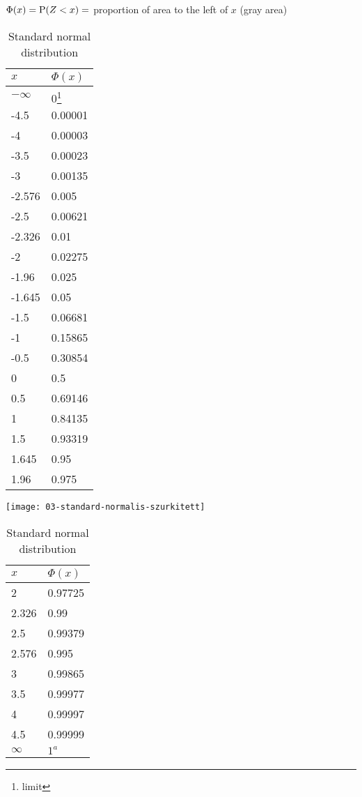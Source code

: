 \begin{table}[!h]\centering \small
\caption{Standard normal distribution}


 
	$\Phi(x)=\P(Z < x) =$ proportion of area to the left of $x$ (gray area)

	\begin{minipage}{0.4\textwidth}\flushright
		\begin{tabular}{ll}
		\toprule
		$x$		& $\Phi(x)$ \\
		\midrule
		$-\infty$	& $0$\footnote{limit}\\
		-4.5		& 0.00001\\
		-4		& 0.00003\\
		-3.5		& 0.00023\\
		-3		& 0.00135\\
		\midrule
		-2.576		& 0.005\\
		-2.5		& 0.00621\\
		-2.326		& 0.01\\
		-2		& 0.02275\\
		\midrule
		-1.96		& 0.025\\
		-1.645		& 0.05\\
		-1.5		& 0.06681\\
		-1		& 0.15865\\
		\midrule		
		-0.5		& 0.30854\\
		0		& 0.5\\
		0.5		& 0.69146\\
		\midrule
		1		& 0.84135\\
		1.5		& 0.93319\\
		1.645		& 0.95\\
		1.96		& 0.975\\		
		\bottomrule
		\end{tabular}\hspace{2em}
	\end{minipage}
	\begin{minipage}{0.4\textwidth}
		\texttt{[image: 03-standard-normalis-szurkitett]}

		\begin{tabular}{ll}
		\toprule
		$x$		& $\Phi(x)$ \\
		\midrule
		2		& 0.97725\\
		2.326		& 0.99\\
		2.5		& 0.99379\\
		2.576		& 0.995\\
		\midrule
		3		& 0.99865\\
		3.5		& 0.99977\\
		4		& 0.99997\\
		4.5		& 0.99999\\
		$\infty$	& $1^a$\\
		\bottomrule
		\end{tabular}
		\end{minipage}		
\end{table}



